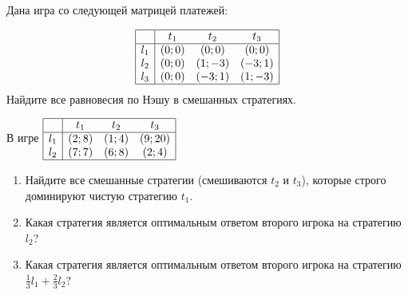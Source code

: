 \begin{problem}
\begin{enumerate}
\end{enumerate}


\begin{sol}

\end{sol}
\end{problem}

\begin{problem} Дана игра со следующей матрицей платежей:

\[\begin{array}{|c|ccc|}  \hline {} & {t_{1} } & {t_{2} } & {t_{3} } \\  \hline {l_{1} } & {\left(0;0\right)} & {\left(0;0\right)} & {\left(0;0\right)} \\ {l_{2} } & {\left(0;0\right)} & {\left(1;-3\right)} & {\left(-3;1\right)} \\ {l_{3} } & {\left(0;0\right)} & {\left(-3;1\right)} & {\left(1;-3\right)} \\  \hline  \end{array}\]
Найдите все равновесия по Нэшу в смешанных стратегиях.



\begin{sol}

\end{sol}
\end{problem}

\begin{problem}
В игре
$\begin{array}{|c|ccc|}
\hline
{} & {t_{1} } & {t_{2} } & {t_{3} } \\
\hline
{l_{1} } & {\left(2;8\right)} & {\left(1;4\right)} & {\left(9;20\right)} \\ {l_{2} } & {\left(7;7\right)} & {\left(6;8\right)} & {\left(2;4\right)} \\  \hline
\end{array}$
\begin{enumerate}
\item Найдите все смешанные стратегии (смешиваются  $t_{2}$  и  $t_{3}$), которые строго доминируют чистую стратегию  $t_{1}$.\par
\item Какая стратегия является оптимальным ответом второго игрока на стратегию  $l_{2}$?\par
\item  Какая стратегия является оптимальным ответом второго игрока на стратегию  $\frac{1}{3} l_{1} +\frac{2}{3} l_{2}$?\par
\end{enumerate}


\begin{sol}

\end{sol}
\end{problem}




